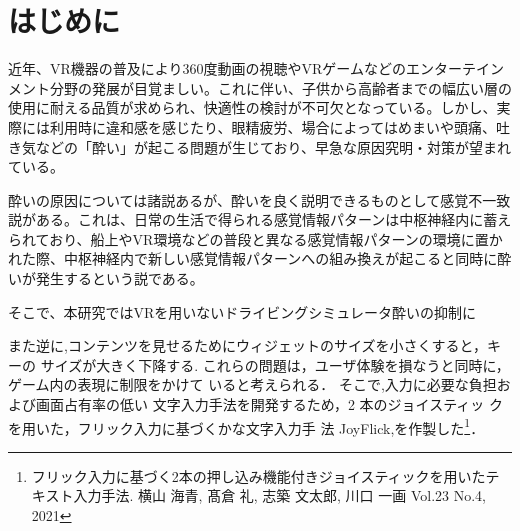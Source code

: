 \documentclass[uplatex]{jsarticle}
\begin{document}
\vspace{3mm}

\setcounter{page}{9}

\section{はじめに}
近年、VR機器の普及により360度動画の視聴やVRゲームなどのエンターテインメント分野の発展が目覚ましい。これに伴い、子供から高齢者までの幅広い層の使用に耐える品質が求められ、快適性の検討が不可欠となっている。しかし、実際には利用時に違和感を感じたり、眼精疲労、場合によってはめまいや頭痛、吐き気などの「酔い」が起こる問題が生じており、早急な原因究明・対策が望まれている。

酔いの原因については諸説あるが、酔いを良く説明できるものとして感覚不一致説\cite{SensoryConflictTheory}がある。これは、日常の生活で得られる感覚情報パターンは中枢神経内に蓄えられており、船上やVR環境などの普段と異なる感覚情報パターンの環境に置かれた際、中枢神経内で新しい感覚情報パターンへの組み換えが起こると同時に酔いが発生するという説である。

そこで、本研究ではVRを用いないドライビングシミュレータ酔いの抑制に

また逆に,コンテンツを見せるためにウィジェットのサイズを小さくすると，キーの
サイズが大きく下降する.
これらの問題は，ユーザ体験を損なうと同時に，ゲーム内の表現に制限をかけて
いると考えられる．
そこで,入力に必要な負担および画面占有率の低い
文字入力手法を開発するため，2 本のジョイスティッ
クを用いた，フリック入力に基づくかな文字入力手
法 JoyFlick\cite{joyflick},\cite{joyflick_eng}を作製した\footnote{フリック入力に基づく2本の押し込み機能付きジョイスティックを用いたテキスト入力手法. 横山 海青, 髙倉 礼, 志築 文太郎, 川口 一画 Vol.23 No.4, 2021 }．
\end{document}
